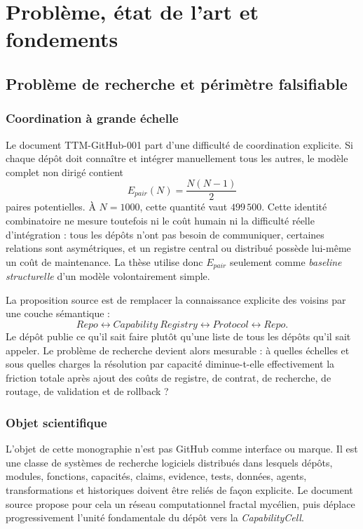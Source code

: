 \part{Problème, état de l'art et fondements}

\chapter{Problème de recherche et périmètre falsifiable}

\section{Coordination à grande échelle}

Le document TTM-GitHub-001 part d'une difficulté de coordination explicite. Si chaque dépôt doit connaître et intégrer manuellement tous les autres, le modèle complet non dirigé contient
\[
E_{pair}(N)=\frac{N(N-1)}{2}
\]
paires potentielles. À $N=1000$, cette quantité vaut $499\,500$. Cette identité combinatoire ne mesure toutefois ni le coût humain ni la difficulté réelle d'intégration : tous les dépôts n'ont pas besoin de communiquer, certaines relations sont asymétriques, et un registre central ou distribué possède lui-même un coût de maintenance. La thèse utilise donc $E_{pair}$ seulement comme \emph{baseline structurelle} d'un modèle volontairement simple.

La proposition source est de remplacer la connaissance explicite des voisins par une couche sémantique :
\[
Repo\leftrightarrow Capability\ Registry\leftrightarrow Protocol\leftrightarrow Repo.
\]
Le dépôt publie ce qu'il sait faire plutôt qu'une liste de tous les dépôts qu'il sait appeler. Le problème de recherche devient alors mesurable : à quelles échelles et sous quelles charges la résolution par capacité diminue-t-elle effectivement la friction totale après ajout des coûts de registre, de contrat, de recherche, de routage, de validation et de rollback ?

\section{Objet scientifique}

L'objet de cette monographie n'est pas GitHub comme interface ou marque. Il est une classe de systèmes de recherche logiciels distribués dans lesquels dépôts, modules, fonctions, capacités, claims, evidence, tests, données, agents, transformations et historiques doivent être reliés de façon explicite. Le document source propose pour cela un réseau computationnel fractal mycélien, puis déplace progressivement l'unité fondamentale du dépôt vers la \emph{CapabilityCell}.

